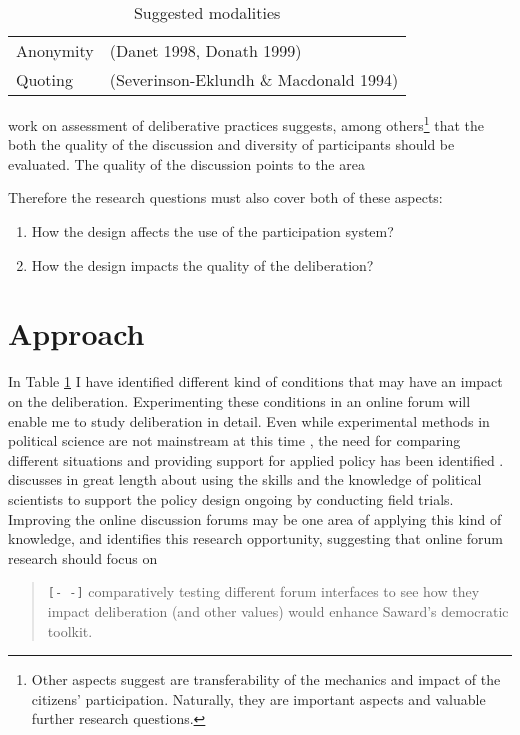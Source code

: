 \documentclass[journal,a4paper]{IEEEtran}
\begin{document}
\begin{table}
\caption{Suggested modalities}
\begin{tabular}{ll}
Anonymity & (Danet 1998, Donath 1999)  \\ 
Quoting & (Severinson-Eklundh \& Macdonald 1994) \\ 
\end{tabular} 
\label{tab:modalities}
\end{table}

 work on assessment of deliberative practices suggests, among others\footnote{Other aspects  suggest are transferability of the mechanics and impact of the citizens' participation. Naturally, they are important aspects and valuable further research questions.} that the both the quality of the discussion and diversity of participants should be evaluated. The quality of the discussion points to the area

Therefore the research questions must also cover both of these aspects:

\begin{enumerate}
\item How the design affects the use of the participation system?
\item How the design impacts the quality of the deliberation?
\end{enumerate}

\section{Approach}

In Table \ref{tab:modalities} I have identified different kind of conditions that may have an impact on the deliberation. Experimenting these conditions in an online forum will enable me to study deliberation in detail. Even while experimental methods in political science are not mainstream at this time \cite{green03,druckman06}, the need for comparing different situations and providing support for applied policy has been identified \cite{stoker10}.  discusses in great length about using the skills and the knowledge of political scientists to support the policy design ongoing by conducting field trials. Improving the online discussion forums may be one area of applying this kind of knowledge, and  identifies this research opportunity, suggesting that online forum research should focus on

\begin{quote}
\texttt{[- -]} comparatively testing different forum interfaces to see how they impact deliberation (and other values) would 
enhance Saward’s democratic toolkit.
\end{quote}
\end{document}
